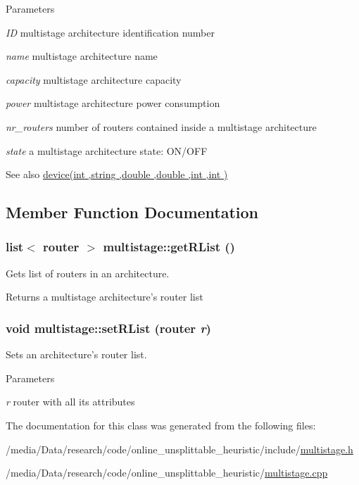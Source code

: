 \begin{DoxyParams}{Parameters}
\item[{\em ID}]multistage architecture identification number \item[{\em name}]multistage architecture name \item[{\em capacity}]multistage architecture capacity \item[{\em power}]multistage architecture power consumption \item[{\em nr\_\-routers}]number of routers contained inside a multistage architecture \item[{\em state}]a multistage architecture state: ON/OFF \end{DoxyParams}
\begin{DoxySeeAlso}{See also}
\hyperlink{classdevice_a57b9c4ac7a8bd970b81b1154ae79a5de}{device(int ,string ,double ,double ,int ,int )} 
\end{DoxySeeAlso}


\subsection{Member Function Documentation}
\hypertarget{classmultistage_ad42d7006ba661c60eb4958f8534ad89a}{
\subsubsection[{getRList}]{\setlength{\rightskip}{0pt plus 5cm}list$<$ {\bf router} $>$ multistage::getRList ()}}
\label{classmultistage_ad42d7006ba661c60eb4958f8534ad89a}


Gets list of routers in an architecture. 

\begin{DoxyReturn}{Returns}
a multistage architecture's router list 
\end{DoxyReturn}
\hypertarget{classmultistage_a6f79ee151acaff9a49e06a3300371a2c}{
\subsubsection[{setRList}]{\setlength{\rightskip}{0pt plus 5cm}void multistage::setRList ({\bf router} {\em r})}}
\label{classmultistage_a6f79ee151acaff9a49e06a3300371a2c}


Sets an architecture's router list. 


\begin{DoxyParams}{Parameters}
\item[{\em r}]router with all its attributes \end{DoxyParams}


The documentation for this class was generated from the following files:\begin{DoxyCompactItemize}
\item 
/media/Data/research/code/online\_\-unsplittable\_\-heuristic/include/\hyperlink{multistage_8h}{multistage.h}\item 
/media/Data/research/code/online\_\-unsplittable\_\-heuristic/\hyperlink{multistage_8cpp}{multistage.cpp}\end{DoxyCompactItemize}
